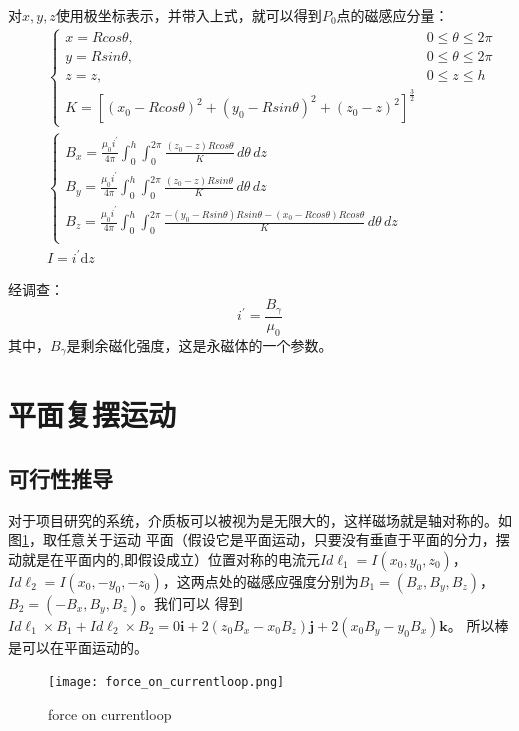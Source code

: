 \documentclass[AutoFakeBold]{LZUThesis}
\begin{document}
对$x, y, z$使用极坐标表示，并带入上式，就可以得到$P_{0}$点的磁感应分量：
\begin{equation}
    \begin{aligned}
        & \quad
        \left  \{
        \begin{array}{lr}
        x = Rcos\theta, & 0\leq \theta \leq 2\pi \\
        y = Rsin\theta, & 0\leq \theta \leq 2\pi \\
        z = z, & 0\leq z \leq h\\
        K = [(x_0 - Rcos\theta)^2 + (y_0 -Rsin\theta)^2 + (z_0 - z)^2]^\frac{3}{2}
        \end{array}
        \right.\\
        & \quad
        \left \{
        \begin{array}{lr}
        B_x = \frac{\mu_0i^{'}}{4\pi} \int_{0}^{h}\int_{0}^{2\pi} \frac{(z_0 - z)Rcos\theta}{K} \,d\theta\,dz & \\
        B_y = \frac{\mu_0i^{'}}{4\pi} \int_{0}^{h}\int_{0}^{2\pi} \frac{(z_0 - z)Rsin\theta}{K} \,d\theta\,dz & \\
        B_z = \frac{\mu_0i^{'}}{4\pi} \int_{0}^{h}\int_{0}^{2\pi} \frac{-(y_0 - Rsin\theta)Rsin\theta -(x_0 - Rcos\theta)Rcos\theta}{K} \,d\theta\,dz & \\
        \end{array}
        \right.\\
        & \quad
        I = i^{'}\text{d}z
    \end{aligned}
\end{equation}

经调查\cite{圆柱形永磁体磁场建模及仿真研究}：
\begin{equation}
    i^{'} = \frac{B_{\gamma}}{\mu_{0}}
\end{equation}
其中，$B_{\gamma}$是剩余磁化强度，这是永磁体的一个参数。

\section{平面复摆运动}
\subsection{可行性推导}
对于项目研究的系统，介质板可以被视为是无限大的，这样磁场就是轴对称的。如图\ref{force_on_currentloop}，取任意关于运动
平面（假设它是平面运动，只要没有垂直于平面的分力，摆动就是在平面内的,即假设成立）位置对称的电流元$Id\boldsymbol {\ell }_1 = I(x_0, y_0, z_0)$，
$Id\boldsymbol {\ell }_2 = I(x_0, -y_0, -z_0)$，这两点处的磁感应强度分别为$B_1 = (B_x, B_y, B_z)$，$B_2 = (-B_x, B_y, B_z)$。我们可以
得到$Id\boldsymbol {\ell }_1 \times B_1 + Id\boldsymbol {\ell }_2 \times B_2 = 0\mathbf{i} + 2(z_0B_x-x_0B_z)\mathbf{j} + 2(x_0B_y-y_0B_x)\mathbf{k}$。
所以棒是可以在平面运动的。
\begin{figure}[H]
    \centering
    \texttt{[image: force\_on\_currentloop.png]}
    \caption{force on currentloop}
    \label{force_on_currentloop}
\end{figure}
\end{document}
